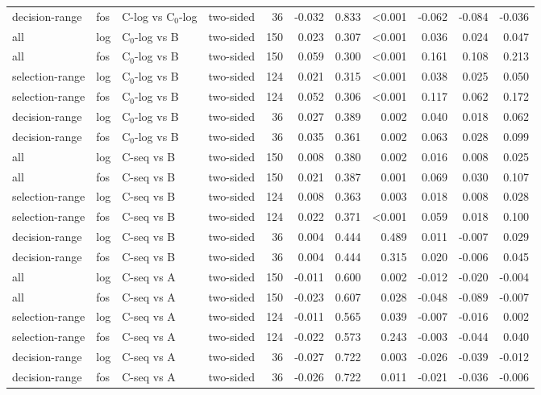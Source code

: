 \begin{longtable}{llllrrrrrrr}
decision-range & fos & C-log vs C$_0$-log & two-sided & 36 & -0.032 & 0.833 & <0.001 & -0.062 & -0.084 & -0.036 \\
all & log & C$_0$-log vs B & two-sided & 150 & 0.023 & 0.307 & <0.001 & 0.036 & 0.024 & 0.047 \\
all & fos & C$_0$-log vs B & two-sided & 150 & 0.059 & 0.300 & <0.001 & 0.161 & 0.108 & 0.213 \\
selection-range & log & C$_0$-log vs B & two-sided & 124 & 0.021 & 0.315 & <0.001 & 0.038 & 0.025 & 0.050 \\
selection-range & fos & C$_0$-log vs B & two-sided & 124 & 0.052 & 0.306 & <0.001 & 0.117 & 0.062 & 0.172 \\
decision-range & log & C$_0$-log vs B & two-sided & 36 & 0.027 & 0.389 & 0.002 & 0.040 & 0.018 & 0.062 \\
decision-range & fos & C$_0$-log vs B & two-sided & 36 & 0.035 & 0.361 & 0.002 & 0.063 & 0.028 & 0.099 \\
all & log & C-seq vs B & two-sided & 150 & 0.008 & 0.380 & 0.002 & 0.016 & 0.008 & 0.025 \\
all & fos & C-seq vs B & two-sided & 150 & 0.021 & 0.387 & 0.001 & 0.069 & 0.030 & 0.107 \\
selection-range & log & C-seq vs B & two-sided & 124 & 0.008 & 0.363 & 0.003 & 0.018 & 0.008 & 0.028 \\
selection-range & fos & C-seq vs B & two-sided & 124 & 0.022 & 0.371 & <0.001 & 0.059 & 0.018 & 0.100 \\
decision-range & log & C-seq vs B & two-sided & 36 & 0.004 & 0.444 & 0.489 & 0.011 & -0.007 & 0.029 \\
decision-range & fos & C-seq vs B & two-sided & 36 & 0.004 & 0.444 & 0.315 & 0.020 & -0.006 & 0.045 \\
all & log & C-seq vs A & two-sided & 150 & -0.011 & 0.600 & 0.002 & -0.012 & -0.020 & -0.004 \\
all & fos & C-seq vs A & two-sided & 150 & -0.023 & 0.607 & 0.028 & -0.048 & -0.089 & -0.007 \\
selection-range & log & C-seq vs A & two-sided & 124 & -0.011 & 0.565 & 0.039 & -0.007 & -0.016 & 0.002 \\
selection-range & fos & C-seq vs A & two-sided & 124 & -0.022 & 0.573 & 0.243 & -0.003 & -0.044 & 0.040 \\
decision-range & log & C-seq vs A & two-sided & 36 & -0.027 & 0.722 & 0.003 & -0.026 & -0.039 & -0.012 \\
decision-range & fos & C-seq vs A & two-sided & 36 & -0.026 & 0.722 & 0.011 & -0.021 & -0.036 & -0.006 \\

\end{longtable}
